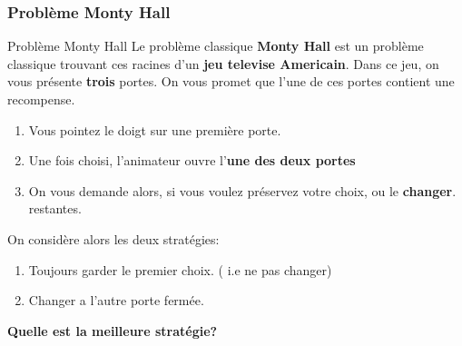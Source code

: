 \documentclass{beamer}
\begin{document}
  \begin{frame}[t]
    \frametitle{Problème Monty Hall }
   \begin{block}{Problème Monty Hall}
    \scriptsize
    Le problème classique \alert{\textbf{Monty Hall}}  est un problème classique
    trouvant ces racines d'un \textbf{jeu televise Americain}. Dans ce jeu, on
    vous présente \textbf{trois} portes. On vous promet que l'une de ces portes
    contient une \alert{recompense}.\\[4pt]
    \begin{enumerate}
      \scriptsize
      \item Vous pointez le doigt sur une première porte.\\[4pt]
      \item Une fois choisi, l'animateur ouvre l'\textbf{une des deux
        portes}\\[4pt]
      \item On vous demande alors, si vous voulez préservez votre choix, ou le
        \textbf{changer}.
        restantes.
    \end{enumerate}
   \end{block} 
    On considère alors les deux stratégies:

    \begin{enumerate}
      \scriptsize
      \item Toujours garder le premier choix. ( i.e ne pas changer)
      \item Changer a l'autre porte fermée.
    \end{enumerate}
    \centering
    \alert{\textbf{Quelle est la meilleure stratégie?}} 
  \end{frame}
\end{document}
